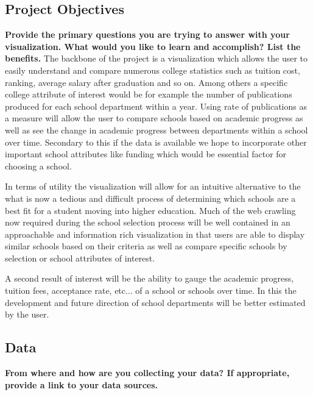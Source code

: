 \documentclass[11pt, a4paper]{article}
\begin{document}
\subsection{Project Objectives}\textbf{ Provide the primary questions you are trying to answer with your visualization. What would you like to learn and accomplish? List the benefits.}
The backbone of the project is a visualization which allows the user to easily understand and compare numerous college statistics such as tuition cost, ranking, average salary after graduation and so on. Among others a specific college attribute of interest would be for example the number of publications produced for each school department within a year. Using rate of publications as a measure will allow the user to compare schools based on academic progress as well as see the change in academic progress between departments within a school over time. Secondary to this if the data is available we hope to incorporate other important school attributes like funding which would be essential factor for choosing a school.

In terms of utility the visualization will allow for an intuitive alternative to the what is now a tedious and difficult process of determining which schools are a best fit for a student moving into higher education. Much of the web crawling now required during the school selection process will be well contained in an approachable and information rich visualization in that users are able to display similar schools based on their criteria as well as compare specific schools by selection or school attributes of interest.

A second result of interest will be the ability to gauge the academic progress, tuition fees, acceptance rate, etc... of a school or schools over time. In this the development and future direction of school departments will be better estimated by the user. 

\subsection{Data}\textbf{ From where and how are you collecting your data? If appropriate, provide a link to your data sources.}
\end{document}
